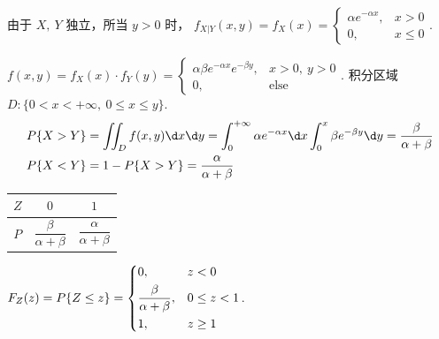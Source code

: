 \begin{solution}\leavevmode
  \begin{enumerate}
    \item 由于 $X,~ Y$ 独立，所当 $y > 0$ 时，
    $f_{X|Y}(x,y) = f_X(x) =
    \begin{cases}
      \alpha e^{-\alpha x}, & x > 0\\
      0,                    & x \leq 0
    \end{cases}$.
    \item $f(x,y) = f_X(x) \cdot f_Y(y) =
    \begin{cases}
      \alpha \beta e^{-\alpha x} e^{-\beta y}, & x > 0,~ y > 0\\
      0,                                       & \text{else}
    \end{cases}$. 积分区域 $D:\{0 < x < +\infty,~ 0 \leq x \leq y\}$.
    \begin{align*}
    & P\{X > Y\}
    = \iint_D f(x,y)\d x \d y
    = \int_0^{+\infty} \alpha e^{-\alpha x}\d x \int_0^x \beta e^{-\beta y}\d y
    = \frac{\beta}{\alpha + \beta}\\
    & P\{X < Y\} = 1 - P\{X > Y\} = \frac{\alpha}{\alpha + \beta}
    \end{align*}
    \begin{minipage}{.54\linewidth}
      \centering
      \begin{minipage}{.36\linewidth}
        \centering
      \end{minipage}
      \hfill
      \begin{minipage}{.6\linewidth}
        \centering
        \begin{tabular}{*3c}
          \toprule
          $Z$ & $0$ & $1$\\
          \midrule
          $P$ & $\dfrac{\beta}{\alpha + \beta}$
              & $\dfrac{\alpha}{\alpha + \beta}$\\
          \toprule
        \end{tabular}
      \end{minipage}
    \end{minipage}
    \begin{minipage}{.42\linewidth}
      \item $F_Z(z) = P\{Z \leq z\} =
      \begin{dcases}
        0,                            & z < 0\\
        \frac{\beta}{\alpha + \beta}, & 0 \leq z < 1\\
        1,                            & z \geq 1
      \end{dcases}$.
    \end{minipage}
  \end{enumerate}
\end{solution}

